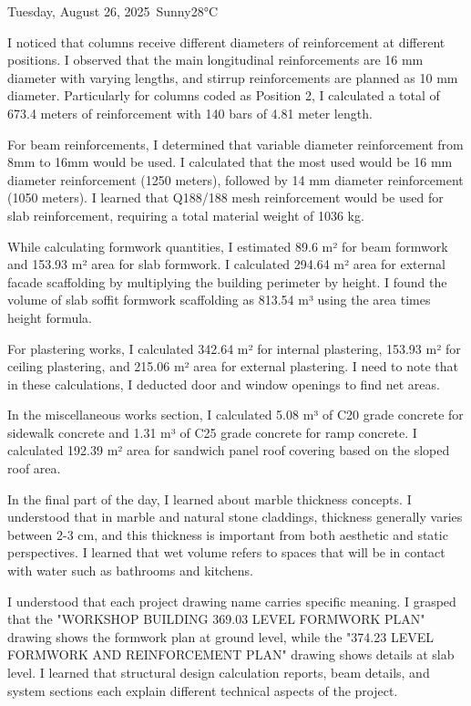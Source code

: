 \begin{dailyentry}{Tuesday, August 26, 2025}{\weathersunny\ Sunny}{28°C}
\begin{workcontent}
I noticed that columns receive different diameters of reinforcement at different positions. I observed that the main longitudinal reinforcements are 16 mm diameter with varying lengths, and stirrup reinforcements are planned as 10 mm diameter. Particularly for columns coded as Position 2, I calculated a total of 673.4 meters of reinforcement with 140 bars of 4.81 meter length.

For beam reinforcements, I determined that variable diameter reinforcement from 8mm to 16mm would be used. I calculated that the most used would be 16 mm diameter reinforcement (1250 meters), followed by 14 mm diameter reinforcement (1050 meters). I learned that Q188/188 mesh reinforcement would be used for slab reinforcement, requiring a total material weight of 1036 kg.

While calculating formwork quantities, I estimated 89.6 m² for beam formwork and 153.93 m² area for slab formwork. I calculated 294.64 m² area for external facade scaffolding by multiplying the building perimeter by height. I found the volume of slab soffit formwork scaffolding as 813.54 m³ using the area times height formula.

For plastering works, I calculated 342.64 m² for internal plastering, 153.93 m² for ceiling plastering, and 215.06 m² area for external plastering. I need to note that in these calculations, I deducted door and window openings to find net areas.

In the miscellaneous works section, I calculated 5.08 m³ of C20 grade concrete for sidewalk concrete and 1.31 m³ of C25 grade concrete for ramp concrete. I calculated 192.39 m² area for sandwich panel roof covering based on the sloped roof area.

In the final part of the day, I learned about marble thickness concepts. I understood that in marble and natural stone claddings, thickness generally varies between 2-3 cm, and this thickness is important from both aesthetic and static perspectives. I learned that wet volume refers to spaces that will be in contact with water such as bathrooms and kitchens.

I understood that each project drawing name carries specific meaning. I grasped that the "WORKSHOP BUILDING 369.03 LEVEL FORMWORK PLAN" drawing shows the formwork plan at ground level, while the "374.23 LEVEL FORMWORK AND REINFORCEMENT PLAN" drawing shows details at slab level. I learned that structural design calculation reports, beam details, and system sections each explain different technical aspects of the project.


\end{workcontent}
\end{dailyentry}
